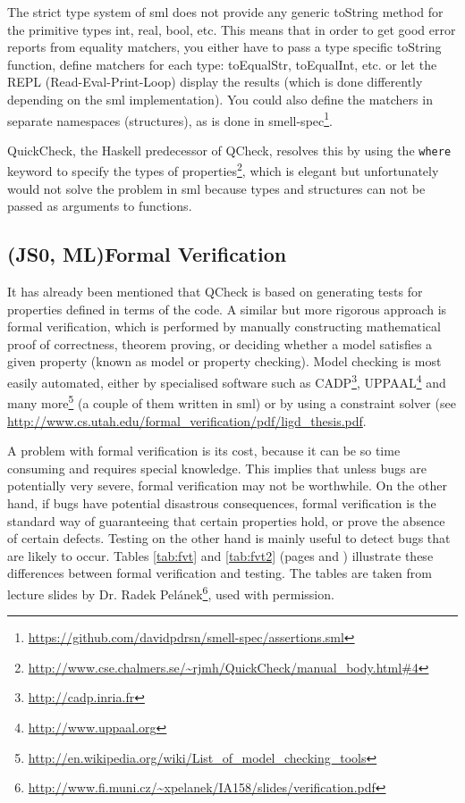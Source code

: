 \documentclass[11pt]{article}
\begin{document}
The strict type system of \gls{sml} does not provide any generic toString method for the primitive types int, real, bool, etc. This means that in order to get good error reports from equality \glspl{matcher}, you either have to pass a type specific toString function, define \glspl{matcher} for each type: toEqualStr, toEqualInt, etc. or let the REPL (Read-Eval-Print-Loop) display the results (which is done differently depending on the \gls{sml} implementation). You could also define the \glspl{matcher} in separate namespaces (structures), as is done in smell-spec\footnote{\url{https://github.com/davidpdrsn/smell-spec/assertions.sml}}.

QuickCheck, the Haskell predecessor of QCheck, resolves this by using the \texttt{where} keyword to specify the types of properties\footnote{\url{http://www.cse.chalmers.se/~rjmh/QuickCheck/manual\_body.html\#4}}, which is elegant but unfortunately would not solve the problem in \gls{sml} because types and structures can not be passed as arguments to functions. %

\subsection{(JS0, ML)Formal Verification}
\label{subsec:formalverification}

It has already been mentioned that QCheck is based on generating tests for properties defined in terms of the code. A similar but more rigorous approach is formal verification, which is performed by manually constructing mathematical proof of correctness, theorem proving, or deciding whether a model satisfies a given property (known as model or property checking). Model checking is most easily automated, either by specialised software such as CADP\footnote{\url{http://cadp.inria.fr}}, UPPAAL\footnote{\url{http://www.uppaal.org}} and many more\footnote{\url{http://en.wikipedia.org/wiki/List_of_model_checking_tools}} (a couple of them written in \gls{sml}) or by using a constraint solver (see \url{http://www.cs.utah.edu/formal\_verification/pdf/ligd\_thesis.pdf}. %

A problem with formal verification is its cost, because it can be so time consuming and requires special knowledge. This implies that unless bugs are potentially very severe, formal verification may not be worthwhile. On the other hand, if bugs have potential disastrous consequences, formal verification is the standard way of guaranteeing that certain properties hold, or prove the absence of certain defects. Testing on the other hand is mainly useful to detect bugs that are likely to occur. Tables \ref{tab:fvt} and \ref{tab:fvt2} (pages \pageref{tab:fvt} and \pageref{tab:fvt2}) illustrate these differences between formal verification and testing. The tables are taken from lecture slides by Dr. Radek Pelánek\footnote{\url{http://www.fi.muni.cz/~xpelanek/IA158/slides/verification.pdf}}, used with permission.
\end{document}
